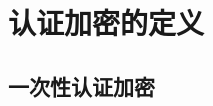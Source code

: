 \section{认证加密的定义}\label{sec:9-1}

\begin{game}[密文完整性]\label{game:9-1}
	
\end{game}

\begin{definition}\label{def:9-1}
	
\end{definition}

\begin{definition}\label{def:9-1}
	
\end{definition}

\subsection{一次性认证加密}\label{subsec:9-1-1}

\begin{definition}\label{def:9-3}
	
\end{definition}

\begin{definition}\label{def:9-4}

\end{definition}